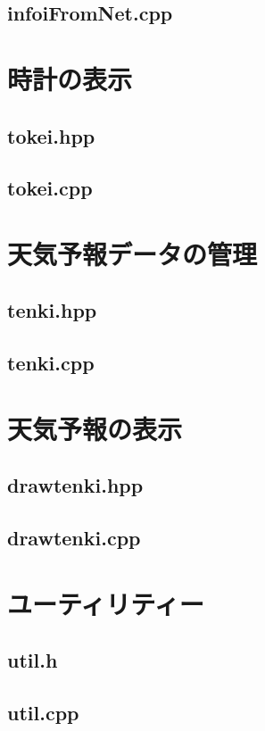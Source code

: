 \documentclass[a4paper, 10pt]{ltjsarticle}
\begin{document}
\subsection{infoiFromNet.cpp}

\clearpage

\section{時計の表示}
\subsection{tokei.hpp}

\subsection{tokei.cpp}

\clearpage

\section{天気予報データの管理}
\subsection{tenki.hpp}

\subsection{tenki.cpp}

\clearpage

\section{天気予報の表示}
\subsection{drawtenki.hpp}

\subsection{drawtenki.cpp}

\clearpage

\section{ユーティリティー}
\subsection{util.h}

\subsection{util.cpp}

\end{document}
